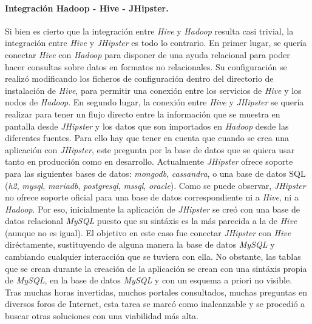 \paragraph*{Integración Hadoop - Hive - JHipster.}

\par
Si bien es cierto que la integración entre \textit{Hive} y \textit{Hadoop} resulta casi trivial, la integración entre \textit{Hive} y \textit{JHipster} es todo lo contrario. En primer lugar, se quería conectar \textit{Hive} con \textit{Hadoop} para disponer de una ayuda relacional para poder hacer consultas sobre datos en formatos no relacionales. Su configuración se realizó modificando los ficheros de configuración dentro del directorio de instalación de \textit{Hive}, para permitir una conexión entre los servicios de \textit{Hive} y los nodos de \textit{Hadoop}. En segundo lugar, la conexión entre \textit{Hive} y \textit{JHipster} se quería realizar para tener un flujo directo entre la información que se muestra en pantalla desde \textit{JHipster} y los datos que son importados en \textit{Hadoop} desde las diferentes fuentes. Para ello hay que tener en cuenta que cuando se crea una aplicación con \textit{JHipster}, este pregunta por la base de datos que se quiera usar tanto en producción como en desarrollo. Actualmente \textit{JHipster} ofrece soporte para las siguientes bases de datos: \textit{\gls{mongodb}}, \textit{\gls{cassandra}}, o una base de datos SQL (\textit{\gls{h2}}, \textit{\gls{mysql}}, \textit{\gls{mariadb}}, \textit{\gls{postgresql}}, \textit{\gls{mssql}}, \textit{\gls{oracle}}).
Como se puede observar, \textit{JHipster} no ofrece soporte oficial para una base de datos correspondiente ni a \textit{Hive}, ni a \textit{Hadoop}. Por eso, inicialmente la aplicación de \textit{JHipster} se creó con una base de datos relacional \textit{MySQL} puesto que su sintáxis es la más parecida a la de \textit{Hive} (aunque no es igual). El objetivo en este caso fue conectar \textit{JHipster} con \textit{Hive} diréctamente, sustituyendo de alguna manera la base de datos \textit{MySQL} y cambiando cualquier interacción que se tuviera con ella. No obstante, las tablas que se crean durante la creación de la aplicación se crean con una sintáxis propia de \textit{MySQL}, en la base de datos \textit{MySQL} y con un esquema a priori no visible. Tras muchas horas invertidas, muchos portales consultados, muchas preguntas en diversos foros de Internet, esta tarea se marcó como inalcanzable y se procedió a buscar otras soluciones con una viabilidad más alta. 


